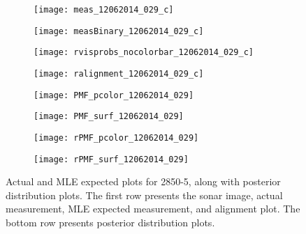 \begin{figure} [h!]
	\centering
	\begin{subfigure}[b]{0.24\textwidth}
                \texttt{[image: meas\_12062014\_029\_c]}
                \caption{}
	\end{subfigure}
  	\centering
	\begin{subfigure}[b]{0.24\textwidth}
                \texttt{[image: measBinary\_12062014\_029\_c]}
		\caption{}
  	\end{subfigure}
  	\centering
	\begin{subfigure}[b]{0.24\textwidth}
                \texttt{[image: rvisprobs\_nocolorbar\_12062014\_029\_c]}
		\caption{}
  	\end{subfigure}
  	\centering
	\begin{subfigure}[b]{0.24\textwidth}
                \texttt{[image: ralignment\_12062014\_029\_c]}
		\caption{}
  	\end{subfigure}

	\centering
	\begin{subfigure}[b]{0.33\textwidth}
                \texttt{[image: PMF\_pcolor\_12062014\_029]}
		\caption{}
  	\end{subfigure}
  	\hspace{8ex}
  	\centering
	\begin{subfigure}[b]{0.33\textwidth}
                \texttt{[image: PMF\_surf\_12062014\_029]}
		\caption{}
  	\end{subfigure}
  	
  	\begin{subfigure}[b]{0.48\textwidth}
                \texttt{[image: rPMF\_pcolor\_12062014\_029]}
		\caption{}
  	\end{subfigure}
  	\centering
	\begin{subfigure}[b]{0.48\textwidth}
                \texttt{[image: rPMF\_surf\_12062014\_029]}
		\caption{}
  	\end{subfigure}
  	
	\caption{Actual and MLE expected plots for 2850-5, along with posterior distribution plots. The first row presents the sonar image, actual measurement, MLE expected measurement, and alignment plot. The bottom row presents posterior distribution plots.}
	\label{fig:badRes2}
\end{figure}

